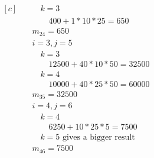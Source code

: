 \documentclass[a4paper]{article}
\begin{document}
\begin{enumerate}
\begin{equation*}
\begin{aligned}[c]
      &\quad \quad k=3 \\
      &\quad \quad \quad 400+1*10*25=650 \\
      &\quad m_{24}=650 \\
      &\quad i=3, j=5 \\
      &\quad \quad k=3 \\
      &\quad \quad \quad 12500+40*10*50=32500 \\
      &\quad \quad k=4 \\
      &\quad \quad \quad 10000+40*25*50=60000 \\
      &\quad m_{35} = 32500 \\
      &\quad i=4, j=6 \\
      &\quad \quad k=4 \\
      &\quad \quad \quad 6250+10*25*5=7500 \\
      &\quad \quad k=5 \text{ gives a bigger result} \\
      &\quad m_{46}=7500
    \end{aligned}
  \end{equation*}


\end{enumerate}
\end{document}
